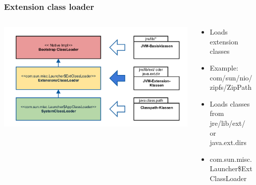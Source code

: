 \documentclass[aspectratio=169]{beamer}
\begin{document}
\begin{frame}
	\frametitle{Extension class loader}
	\begin{columns}[T] 
		\begin{column}{.46\textwidth}
			\includegraphics[scale=0.06]{assets/classloader-hierachie-extension-active.png} %
		\end{column}
		\hfill
		\begin{column}{.56\textwidth}

		\begin{itemize}
			\item{Loads extension classes}
			\item{Example: com/sun/nio/zipfs/ZipPath}
			\item{Loads classes from jre/lib/ext/ or java.ext.dirs}
			\item{com.sun.misc.Launcher\$ExtClassLoader}
		\end{itemize}
		\end{column}
	\end{columns}
\end{frame}
\end{document}
